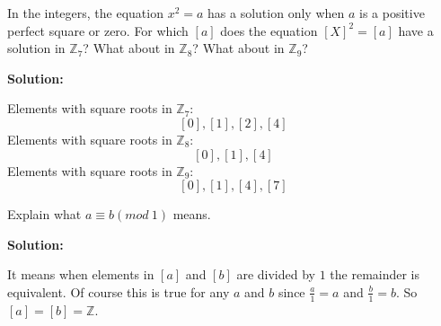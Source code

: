 \begin{tcolorbox}[title=Problem 13, breakable]
    In the integers, the equation $x^2 = a$ has a solution only when $a$
    is a positive perfect square or zero. For which $[a]$ does the equation 
    $[X]^2 = [a]$ have a solution in $\mathbb{Z}_7$?
    What about in $\mathbb{Z}_8$?
    What about in $\mathbb{Z}_9$?
\end{tcolorbox}

\textbf{Solution:}

Elements with square roots in $\mathbb{Z}_7$: 
\[[0], [1], [2], [4]\]
Elements with square roots in $\mathbb{Z}_8$: 
\[[0], [1], [4]\]
Elements with square roots in $\mathbb{Z}_9$: 
\[[0], [1], [4], [7]\]

\begin{tcolorbox}[title=Problem 14, breakable]
    Explain what $a \equiv b (mod\ 1)$ means.
\end{tcolorbox}

\textbf{Solution:}

It means when elements in $[a]$ and $[b]$ are divided by $1$ the remainder is equivalent.
Of course this is true for any $a$ and $b$ since $\frac{a}{1} = a$ and $\frac{b}{1} = b$.
So $[a] = [b] = \mathbb{Z}$.